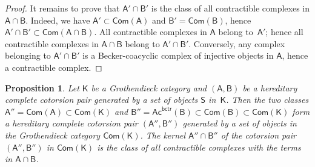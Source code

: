 \documentclass[12pt,a4paper]{amsart}
\newcommand{\+}{\nobreakdash-}
\renewcommand{\:}{\colon}
\newcommand{\sA}{\mathsf A}
\newcommand{\sB}{\mathsf B}
\newcommand{\sK}{\mathsf K}
\newcommand{\sS}{\mathsf S}
\newcommand{\Com}{\mathsf{Com}}
\newcommand{\Ac}{\mathsf{Ac}}
\newcommand{\bctr}{\mathsf{bctr}}
\theoremstyle{plain}
\newtheorem{prop}[thm]{Proposition}
\theoremstyle{definition}
\begin{document}
\begin{proof}
 It remains to prove that $\sA'\cap\sB'$ is the class of all
contractible complexes in $\sA\cap\sB$.
 Indeed, we have $\sA'\subset\Com(\sA)$ and $\sB'=\Com(\sB)$, hence
$\sA'\cap\sB'\subset\Com(\sA\cap\sB)$.
 All contractible complexes in $\sA$ belong to~$\sA'$; hence all
contractible complexes in $\sA\cap\sB$ belong to $\sA'\cap\sB'$.
 Conversely, any complex belonging to $\sA'\cap\sB'$ is
a Becker-coacyclic complex of injective objects in $\sA$, hence
a contractible complex.
\end{proof}

\begin{prop} \label{all-contraacyclic-cotorsion-pair-prop}
 Let\/ $\sK$ be a Grothendieck category and $(\sA,\sB)$ be
a hereditary complete cotorsion pair generated by a set of objects\/
$\sS$ in\/~$\sK$.
 Then the two classes\/ $\sA''=\Com(\sA)\subset\Com(\sK)$ and $\sB''=
\Ac^\bctr(\sB)\subset\Com(\sB)\subset\Com(\sK)$ form a hereditary
complete cotorsion pair $(\sA'',\sB'')$ generated by a set of objects
in the Grothendieck category\/ $\Com(\sK)$.
 The kernel\/ $\sA''\cap\sB''$ of the cotorsion pair $(\sA'',\sB'')$
in\/ $\Com(\sK)$ is the class of all contractible complexes with
the terms in\/ $\sA\cap\sB$.
\end{prop}
\end{document}
